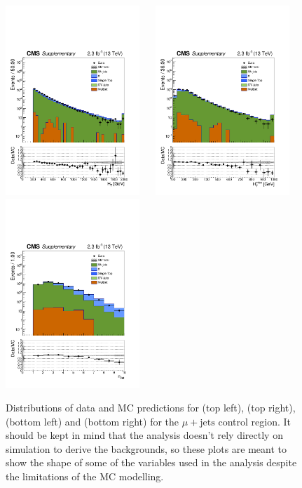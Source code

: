 \clearpage
\begin{figure}[tbhp]
    \caption{ 
    Distributions of data and MC predictions for \scalht (top left), \mht (top right), \nj (bottom left) and \nb (bottom right) 
    for the $\mu+\mathrm{jets}$ control region. 
    It should be kept in mind that the analysis doesn't rely directly on simulation to derive the backgrounds, 
    so these plots are meant to show the shape of some of the variables used in the analysis despite the limitations 
    of the MC modelling. 
    \label{fig:data-MC_plots_SingleMu} }
  \begin{center}
     \includegraphics[width=0.45\textwidth]{figures/SingleMu_ht40_all_all} ~~
     \includegraphics[width=0.45\textwidth]{figures/SingleMu_mht40_pt_all_all} \\
     \includegraphics[width=0.45\textwidth]{figures/SingleMu_nJet40_all_all} ~~

\end{center}
\end{figure}
